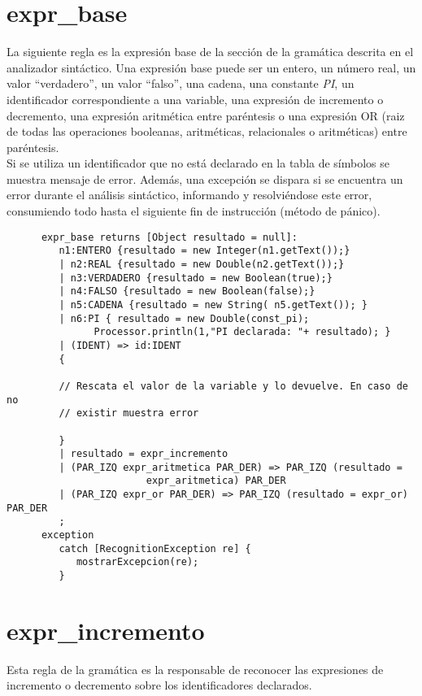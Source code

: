    \section{expr\_base}
   La siguiente regla es la expresión base de la sección de la gramática descrita en el analizador sintáctico. Una expresión
   base puede ser un entero, un número real, un valor ``verdadero'', un valor ``falso'', una cadena, una constante \textit{PI}, un identificador
   correspondiente a una variable, una expresión de incremento o decremento, una expresión aritmética entre paréntesis o una 
   expresión OR (raiz de todas las operaciones booleanas, aritméticas, relacionales o aritméticas) entre paréntesis.\\

   Si se utiliza un identificador que no está declarado en la tabla de símbolos se muestra mensaje de error. Además, una excepción
   se dispara si se encuentra un error durante el análisis sintáctico, informando y resolviéndose este error, consumiendo todo 
   hasta el siguiente fin de instrucción (método de pánico).
   \begin{lstlisting}
      expr_base returns [Object resultado = null]: 
         n1:ENTERO {resultado = new Integer(n1.getText());}
         | n2:REAL {resultado = new Double(n2.getText());}
         | n3:VERDADERO {resultado = new Boolean(true);}
         | n4:FALSO {resultado = new Boolean(false);}
         | n5:CADENA {resultado = new String( n5.getText()); }
         | n6:PI { resultado = new Double(const_pi); 
               Processor.println(1,"PI declarada: "+ resultado); }
         | (IDENT) => id:IDENT
         {
      
         // Rescata el valor de la variable y lo devuelve. En caso de no 
         // existir muestra error
      
         }
         | resultado = expr_incremento
         | (PAR_IZQ expr_aritmetica PAR_DER) => PAR_IZQ (resultado =
                        expr_aritmetica) PAR_DER
         | (PAR_IZQ expr_or PAR_DER) => PAR_IZQ (resultado = expr_or) PAR_DER
         ;
      exception
         catch [RecognitionException re] {
            mostrarExcepcion(re);
         }
   \end{lstlisting}

   \section{expr\_incremento}
   Esta regla de la gramática es la responsable de reconocer las expresiones de incremento o decremento sobre los 
   identificadores declarados. \\

